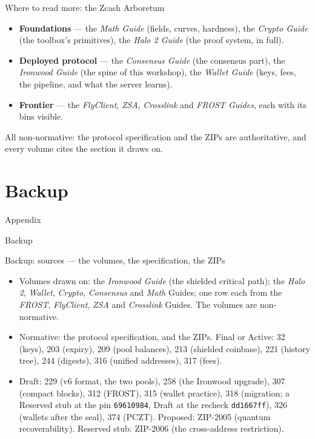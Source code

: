 \documentclass[aspectratio=169,11pt]{beamer}
\newcommand{\divider}[2]{%
  \section{#2}
  \begin{frame}[plain,t]
  \vspace*{14mm}
  {\small\color{arb}#1\par}
  \vskip8mm
  \begin{minipage}{0.88\textwidth}\raggedright
    \fontsize{27}{31}\selectfont #2\par
  \end{minipage}
  \end{frame}}
\begin{document}
\begin{frame}{Where to read more: the Zcash Arboretum}
\begin{itemize}
  \item \textbf{Foundations} --- the \emph{Math Guide} (fields, curves,
    hardness), the \emph{Crypto Guide} (the toolbox's primitives), the
    \emph{Halo 2 Guide} (the proof system, in full).
  \item \textbf{Deployed protocol} --- the \emph{Consensus Guide} (the
    consensus part), the \emph{Ironwood Guide} (the spine of this
    workshop), the
    \emph{Wallet Guide} (keys, fees, the pipeline, and what the server learns).
  \item \textbf{Frontier} --- the \emph{FlyClient}, \emph{ZSA},
    \emph{Crosslink} and \emph{FROST Guides}, each with its bins visible.
\end{itemize}
\medskip
All non-normative: the protocol specification and the ZIPs are
authoritative, and every volume cites the section it draws on.
\end{frame}


\appendix
\divider{Appendix}{Backup}

\begin{frame}{Backup: sources --- the volumes, the specification, the ZIPs}
\begin{itemize}
  \item Volumes drawn on: the \emph{Ironwood Guide} (the shielded critical
    path); the \emph{Halo 2}, \emph{Wallet}, \emph{Crypto},
    \emph{Consensus} and \emph{Math} Guides; one row each from the
    \emph{FROST}, \emph{FlyClient}, \emph{ZSA} and \emph{Crosslink}
    Guides. The volumes are non-normative.
  \item Normative: the protocol specification, and the ZIPs. Final or
    Active: 32 (keys), 203 (expiry), 209 (pool balances), 213 (shielded
    coinbase), 221 (history tree), 244 (digests), 316 (unified
    addresses), 317 (fees).
  \item Draft: 229 (v6 format, the two pools), 258 (the Ironwood
    upgrade), 307 (compact blocks), 312 (FROST), 315 (wallet practice),
    318 (migration; a Reserved stub at the pin \texttt{69610984}, Draft
    at the recheck \texttt{dd1667ff}), 326 (wallets after the seal),
    374 (PCZT). Proposed: ZIP-2005 (quantum recoverability). Reserved
    stub: ZIP-2006 (the cross-address restriction).
\end{itemize}
\end{frame}
\end{document}
